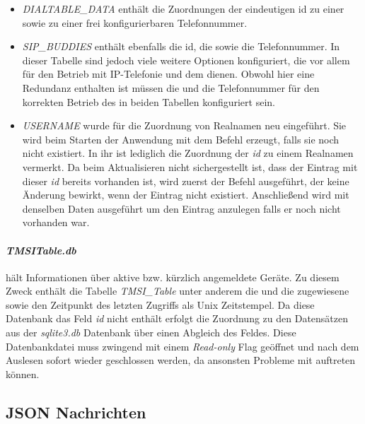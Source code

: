 \begin{itemize}
	\item \textit{DIALTABLE\_DATA} enthält die Zuordnungen der eindeutigen id zu einer \IMSI sowie zu einer frei konfigurierbaren Telefonnummer.
	
	\item \textit{SIP\_BUDDIES} enthält ebenfalls die id, die \IMSI sowie die Telefonnummer. In dieser Tabelle sind jedoch viele weitere Optionen konfiguriert, die vor allem für den Betrieb mit IP-Telefonie und dem \SIP dienen. Obwohl hier eine Redundanz enthalten ist müssen die \IMSI und die Telefonnummer für den korrekten Betrieb des \OpenBTS in beiden Tabellen konfiguriert sein.
	
	\item \textit{USERNAME} wurde für die Zuordnung von Realnamen neu eingeführt. Sie wird beim Starten der Anwendung mit dem \SQL Befehl   erzeugt, falls sie noch nicht existiert. In ihr ist lediglich die Zuordnung der \textit{id} zu einem Realnamen vermerkt. Da beim Aktualisieren nicht sichergestellt ist, dass der Eintrag mit dieser \textit{id} bereits vorhanden ist, wird zuerst der Befehl  ausgeführt, der keine Änderung bewirkt, wenn der Eintrag nicht existiert. Anschließend wird  mit denselben Daten ausgeführt um den Eintrag anzulegen falls er noch nicht vorhanden war.
\end{itemize}


\paragraph{\textit{TMSITable.db}} hält Informationen über aktive bzw. kürzlich angemeldete Geräte. Zu diesem Zweck enthält die Tabelle \textit{TMSI\_Table} unter anderem die \IMSI und die zugewiesene \TMSI sowie den Zeitpunkt des letzten Zugriffs als Unix Zeitstempel. Da diese Datenbank das Feld \textit{id} nicht enthält erfolgt die Zuordnung zu den Datensätzen aus der \textit{sqlite3.db} Datenbank über einen Abgleich des \IMSI Feldes. Diese Datenbankdatei muss zwingend mit einem \textit{Read-only} Flag geöffnet und nach dem Auslesen sofort wieder geschlossen werden, da ansonsten Probleme mit \OpenBTS auftreten können.

\subsection{JSON Nachrichten}
\label{subsec:json}

